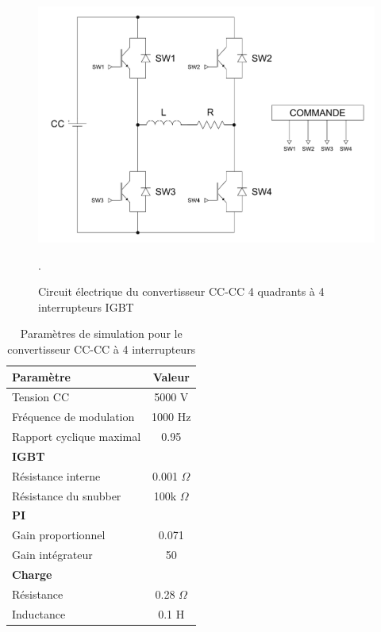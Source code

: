 \begin{figure}[htb]
\centering
\includegraphics[scale=0.5]{fig/H4Q.png}
\caption{Circuit électrique du convertisseur CC-CC 4 quadrants à 4 interrupteurs IGBT}.
\label{i_hach}
\end{figure}

\begin{table}[htb]
\centering
\begin{tabular}{|l|c|} 
  \hline
  \textbf{Paramètre} & \textbf{Valeur}  \\
  \hline\hline
  Tension CC & 5000 V\\ \hline
  Fréquence de modulation & 1000 Hz\\ \hline
  Rapport cyclique maximal & 0.95 \\ \hline \hline
  \multicolumn{2}{|l|}{\textbf{IGBT}}\\ \hline
  Résistance interne & 0.001 $\Omega$\\
  Résistance du snubber & 100k $\Omega$\\ \hline \hline
   \multicolumn{2}{|l|}{\textbf{PI}}\\ \hline
  Gain proportionnel & 0.071 \\
  Gain intégrateur & 50 \\ \hline \hline
  \multicolumn{2}{|l|}{\textbf{Charge}}\\ \hline
  Résistance & 0.28 $\Omega$\\
  Inductance & 0.1 H\\
  \hline
\end{tabular}
\caption{Paramètres de simulation pour le convertisseur CC-CC à 4 interrupteurs}
\label{p_hash}
\end{table}

